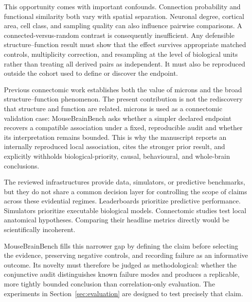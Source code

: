 This opportunity comes with important confounds. Connection probability and
functional similarity both vary with spatial separation. Neuronal degree,
cortical area, cell class, and sampling quality can also influence pairwise
comparisons. A connected-versus-random contrast is consequently insufficient.
Any defensible structure--function result must show that the effect survives
appropriate matched controls, multiplicity correction, and resampling at the
level of biological units rather than treating all derived pairs as independent.
It must also be reproduced outside the cohort used to define or discover the
endpoint.

Previous connectomic work establishes both the value of \acs{microns} and the broad
structure--function phenomenon. The present contribution is not the rediscovery
that structure and function are related. \acs{microns} is used as a connectomic
validation case: MouseBrainBench asks whether a simpler declared endpoint recovers a
compatible association under a fixed, reproducible audit and whether its
interpretation remains bounded. This is why the manuscript reports an internally reproduced
local association, cites the stronger prior result, and explicitly withholds
biological-priority, causal, behavioural, and whole-brain conclusions.

The reviewed infrastructures provide data, simulators, or predictive
benchmarks, but they do not share a common decision layer for controlling the
scope of claims across these evidential regimes. Leaderboards prioritize
predictive performance. Simulators prioritize executable biological models.
Connectomic studies test local anatomical hypotheses. Comparing their headline
metrics directly would be scientifically incoherent.

MouseBrainBench fills this narrower gap by defining the claim before selecting
the evidence, preserving negative controls, and recording failure as an
informative outcome. Its novelty must therefore be judged as methodological:
whether the conjunctive audit distinguishes known failure modes and produces a
replicable, more tightly bounded conclusion than correlation-only evaluation.
The experiments in Section~\ref{sec:evaluation} are designed to test precisely
that claim.

